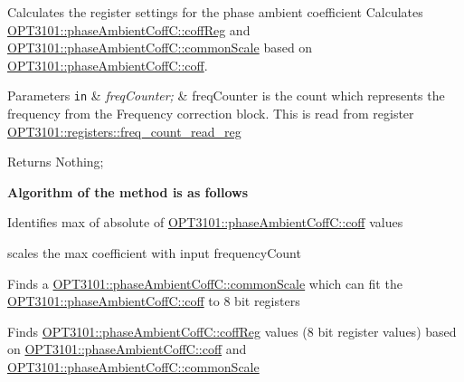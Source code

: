 Calculates the register settings for the phase ambient coefficient Calculates \mbox{\hyperlink{class_o_p_t3101_1_1phase_ambient_coff_c_a267c8f925dedeb8af97aba7ffae95da4}{O\+P\+T3101\+::phase\+Ambient\+Coff\+C\+::coff\+Reg}} and \mbox{\hyperlink{class_o_p_t3101_1_1phase_ambient_coff_c_abed8ff9971976201638badbda9fd4543}{O\+P\+T3101\+::phase\+Ambient\+Coff\+C\+::common\+Scale}} based on \mbox{\hyperlink{class_o_p_t3101_1_1phase_ambient_coff_c_af655f6704c4b3901b82a913f8a047258}{O\+P\+T3101\+::phase\+Ambient\+Coff\+C\+::coff}}. 


\begin{DoxyParams}[1]{Parameters}
\mbox{\tt in}  & {\em freq\+Counter;} & freq\+Counter is the count which represents the frequency from the Frequency correction block. This is read from register \mbox{\hyperlink{class_o_p_t3101_1_1registers_a0d343738560c0bc418f34b458735a811}{O\+P\+T3101\+::registers\+::freq\+\_\+count\+\_\+read\+\_\+reg}} \\
\hline
\end{DoxyParams}
\begin{DoxyReturn}{Returns}
Nothing; 
\end{DoxyReturn}
{\bfseries Algorithm of the method is as follows}


\begin{DoxyItemize}
\item Identifies max of absolute of \mbox{\hyperlink{class_o_p_t3101_1_1phase_ambient_coff_c_af655f6704c4b3901b82a913f8a047258}{O\+P\+T3101\+::phase\+Ambient\+Coff\+C\+::coff}} values ~\newline
~\newline
~\newline

\item scales the max coefficient with input frequency\+Count ~\newline
~\newline

\item Finds a \mbox{\hyperlink{class_o_p_t3101_1_1phase_ambient_coff_c_abed8ff9971976201638badbda9fd4543}{O\+P\+T3101\+::phase\+Ambient\+Coff\+C\+::common\+Scale}} which can fit the \mbox{\hyperlink{class_o_p_t3101_1_1phase_ambient_coff_c_af655f6704c4b3901b82a913f8a047258}{O\+P\+T3101\+::phase\+Ambient\+Coff\+C\+::coff}} to 8 bit registers
\item Finds \mbox{\hyperlink{class_o_p_t3101_1_1phase_ambient_coff_c_a267c8f925dedeb8af97aba7ffae95da4}{O\+P\+T3101\+::phase\+Ambient\+Coff\+C\+::coff\+Reg}} values (8 bit register values) based on \mbox{\hyperlink{class_o_p_t3101_1_1phase_ambient_coff_c_af655f6704c4b3901b82a913f8a047258}{O\+P\+T3101\+::phase\+Ambient\+Coff\+C\+::coff}} and \mbox{\hyperlink{class_o_p_t3101_1_1phase_ambient_coff_c_abed8ff9971976201638badbda9fd4543}{O\+P\+T3101\+::phase\+Ambient\+Coff\+C\+::common\+Scale}} 
\end{DoxyItemize}\mbox{\label{class_o_p_t3101_1_1phase_ambient_coff_c_a41db9882facdbf3b437dcb54958b5763}} 
